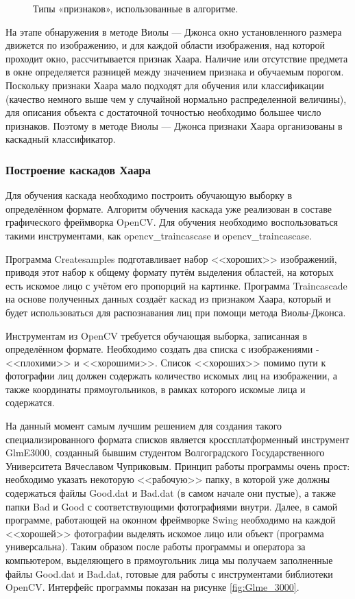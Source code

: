 \documentclass[14pt,a4paper]{scrartcl}
\begin{document}
			\begin{figure}[h]
				\caption{Типы «признаков», использованные в алгоритме.}
				\label{fig:Viola-Jones_types}
			\end{figure}
		
			На этапе обнаружения в методе Виолы — Джонса окно установленного размера движется по изображению, и для каждой области изображения, над которой проходит окно, рассчитывается признак Хаара. Наличие или отсутствие предмета в окне определяется разницей между значением признака и обучаемым порогом. Поскольку признаки Хаара мало подходят для обучения или классификации (качество немного выше чем у случайной нормально распределенной величины), для описания объекта с достаточной точностью необходимо большее число признаков. Поэтому в методе Виолы — Джонса признаки Хаара организованы в каскадный классификатор\cite{bib:Haar_Wikipedia}.
			
		\subsubsection{Построение каскадов Хаара}
		
			Для обучения каскада необходимо построить обучающую выборку в определённом формате. Алгоритм обучения каскада уже реализован в составе графического фреймворка OpenCV. Для обучения необходимо воспользоваться такими инструментами, как opencv\_traincascase и opencv\_traincascase. 
			
			Программа Createsamples подготавливает набор <<хороших>> изображений, приводя этот набор к общему формату путём выделения областей, на которых есть искомое лицо с учётом его пропорций на картинке. Программа Traincascade на основе полученных данных создаёт каскад из признаком Хаара, который и будет использоваться для распознавания лиц при помощи метода Виолы-Джонса.
			
			Инструментам из OpenCV требуется обучающая выборка, записанная в определённом формате. Необходимо создать два списка с изображениями - <<плохими>> и <<хорошими>>. Список <<хороших>> помимо пути к фотографии лиц должен содержать количество искомых лиц на изображении, а также координаты прямоугольников, в рамках которого искомые лица и содержатся\cite{bib:Chuprikov_NIR}.
			
			На данный момент самым лучшим решением для создания такого специализированного формата списков является кроссплатформенный инструмент GlmE3000, созданный бывшим студентом Волгоградского Государственного Университета Вячеславом Чуприковым. Принцип работы программы очень прост: необходимо указать некоторую <<рабочую>> папку, в которой уже должны содержаться файлы Good.dat и Bad.dat (в самом начале они пустые), а также папки Bad и Good с соответствующими фотографиями внутри. Далее, в самой программе, работающей на оконном фреймворке Swing необходимо на каждой <<хорошей>> фотографии выделять искомое лицо или объект (программа универсальна). Таким образом после работы программы и оператора за компьютером, выделяющего в прямоугольник лица мы получаем заполненные файлы Good.dat и Bad.dat, готовые для работы с инструментами библиотеки OpenCV. Интерфейс программы показан на рисунке \ref{fig:Glme_3000}.
			
\end{document}
